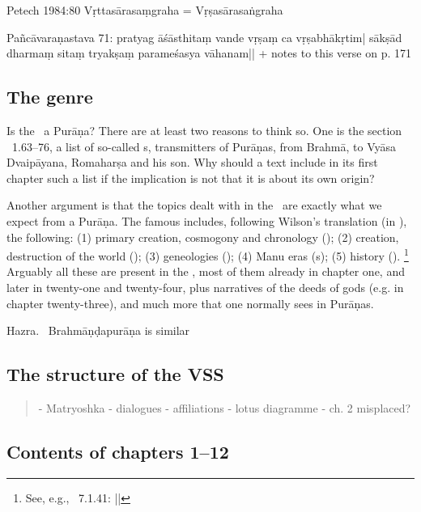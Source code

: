 \documentclass[11pt]{book}
\begin{document}
Petech 1984:80 Vṛttasārasaṃgraha = Vṛṣasārasaṅgraha


Pañcāvaraṇastava 71:
pratyag āśāsthitaṃ vande vṛṣaṃ ca vṛṣabhākṛtim|
sākṣād dharmaṃ sitaṃ tryakṣaṃ parameśasya vāhanam||
+ notes to this verse on p. 171


\subsection{The genre}

Is the \VSS\ a Purāṇa? There are at least two reasons to think so.
One is the section \VSS\ 1.63--76, a list of so-called s, 
transmitters of Purāṇas, from Brahmā, to Vyāsa Dvaipāyana, Romaharṣa and 
his son. Why should a text include in its first chapter such a list if the implication
is not that it is about its own origin?

Another argument is that the topics dealt with in the \VSS\ are exactly what
we expect from a Purāṇa. The famous  includes,
following Wilson's translation (in ), the following:
(1) primary creation, cosmogony and chronology (); 
(2) creation, destruction of the world ();
(3) geneologies (); 
(4) Manu eras (s);
(5) history ().%
		\footnote{See, e.g., \SIVP\ 7.1.41: 
				 ||}
Arguably all these are present in the \VSS, most of them already in chapter one, and later in twenty-one and
twenty-four, plus narratives of the deeds of gods (e.g. in chapter twenty-three), and much more
that one normally sees in Purāṇas.

Hazra. \verify\ Brahmāṇḍapurāṇa is similar \verify



\subsection{The structure of the VSS}

\begin{quote}
- Matryoshka 
- dialogues
- affiliations
- lotus diagramme
- ch. 2 misplaced? 
\end{quote}

\vfill
\pagebreak


\subsection{Contents of chapters 1--12}
\end{document}
